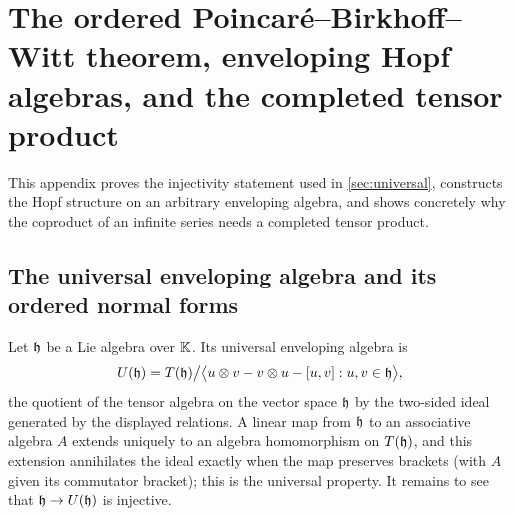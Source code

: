 \section{The ordered Poincar\'e--Birkhoff--Witt theorem, enveloping Hopf algebras, and the completed tensor product}\label{app:pbw}
This appendix proves the injectivity statement used in \cref{sec:universal},
constructs the Hopf structure on an arbitrary enveloping algebra, and shows
concretely why the coproduct of an infinite series needs a completed tensor
product.

\subsection{The universal enveloping algebra and its ordered normal forms}
Let $\mathfrak{h}$ be a Lie algebra over $\mathbb{K}$. Its universal enveloping algebra is
\begin{equation}\label{eq:Udef}
 U(\mathfrak{h})=T(\mathfrak{h})\big/\bigl\langle u\otimes v-v\otimes u-[u,v]:u,v\in\mathfrak{h}\bigr\rangle,
\end{equation}
the quotient of the tensor algebra on the vector space $\mathfrak{h}$ by the
two-sided ideal generated by the displayed relations. A linear map from
$\mathfrak{h}$ to an associative algebra $A$ extends uniquely to an algebra
homomorphism on $T(\mathfrak{h})$, and this extension annihilates the ideal exactly
when the map preserves brackets (with $A$ given its commutator bracket);
this is the universal property. It remains to see that $\mathfrak{h}\to U(\mathfrak{h})$ is
injective.

